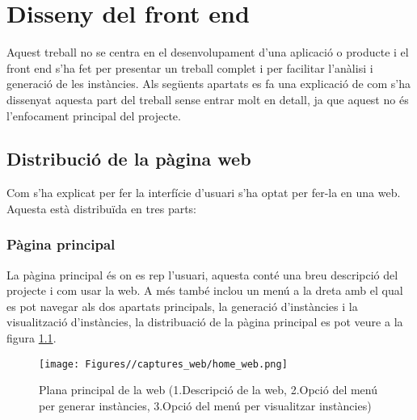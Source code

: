 


\chapter{Disseny del front end} %

\label{Disseny del front end} %

Aquest treball no se centra en el desenvolupament d'una aplicació o producte i el front end s'ha fet per presentar un treball complet i per facilitar l'anàlisi i generació de les instàncies. Als següents apartats es fa una explicació de com s'ha dissenyat aquesta part del treball sense entrar molt en detall, ja que aquest no és l'enfocament principal del projecte.

\section{Distribució de la pàgina web}
Com s'ha explicat per fer la interfície d'usuari s'ha optat per fer-la en una web. Aquesta està distribuïda en tres parts:
\subsection{Pàgina principal}
La pàgina principal és on es rep l'usuari, aquesta conté una breu descripció del projecte i com usar la web. A més també inclou un menú a la dreta amb el qual es pot navegar als dos apartats principals, la generació d'instàncies i la visualització d'instàncies, la distribuació de la pàgina principal es pot veure a la figura \ref{fig:home-webpage}.\\

\begin{figure}[H]
    \centering
    \texttt{[image: Figures//captures\_web/home\_web.png]}
    \caption{Plana principal de la web (1.Descripció de la web, 2.Opció del menú per generar instàncies, 3.Opció del menú per visualitzar instàncies)}
    \label{fig:home-webpage}
\end{figure}

